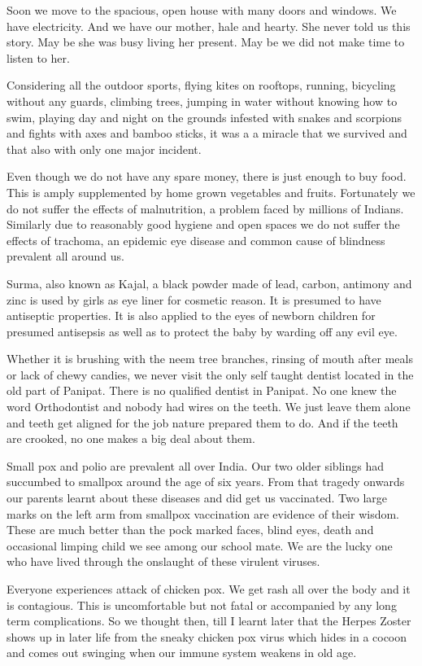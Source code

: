 Soon we move to the spacious, open house with many doors and windows. We
have electricity. And we have our mother, hale and hearty. She never told
us this story. May be she was busy living her present. May be we did not
make time to listen to her. 

Considering all the outdoor sports, flying kites on rooftops, running,
bicycling without any guards, climbing trees, jumping in water without
knowing how to swim, playing day and night on the grounds infested with
snakes and scorpions and fights with axes and bamboo sticks, it was
a a miracle that we survived and that also with only one major incident. 

Even though we do not have any spare money, there is just enough to buy
food. This is amply supplemented by home grown vegetables and fruits.
Fortunately we do not suffer the effects of malnutrition, a problem faced
by millions of Indians. Similarly due to reasonably good hygiene and open
spaces we do not suffer the effects of trachoma, an epidemic eye disease
and common cause of blindness prevalent all around us. 

Surma, also known as Kajal, a black powder made of lead, carbon, antimony
and zinc is used by girls as eye liner for cosmetic reason. It is presumed
to have antiseptic properties. It is also applied to the eyes of newborn
children for presumed antisepsis as well as to protect the baby by warding
off any evil eye. 

Whether it is brushing with the neem tree branches, rinsing of mouth after
meals or lack of chewy candies, we never visit the only self taught
dentist located in the old part of Panipat. There is no qualified dentist
in Panipat. No one knew the word Orthodontist and nobody had wires on the
teeth. We just leave them alone and teeth get aligned for the job nature
prepared them to do. And if the teeth are crooked, no one makes a big deal
about them. 

Small pox and polio are prevalent all over India.  Our two older siblings
had succumbed to smallpox around the age of six years. From that tragedy
onwards our parents learnt about these diseases and did get us vaccinated.
Two large marks on the left arm from smallpox vaccination are evidence of
their wisdom.  These are much better than the pock marked faces, blind
eyes, death and occasional limping child we see among our school mate.  We
are the lucky one who have lived through the onslaught of these virulent
viruses. 

Everyone experiences attack of chicken pox. We get rash all over the body
and it is contagious. This is uncomfortable but not fatal or accompanied
by any long term complications. So we thought then, till I learnt later
that the Herpes Zoster shows up in later life from the sneaky chicken pox
virus which hides in a cocoon and comes out swinging when our immune
system weakens in old age. 

